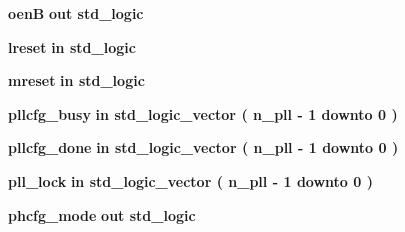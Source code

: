 \begin{DoxyCompactItemize}
\item 
{\bf oenB}  {\bfseries {\bfseries \textcolor{keywordflow}{out}\textcolor{vhdlchar}{ }}} {\bfseries \textcolor{comment}{std\+\_\+logic}\textcolor{vhdlchar}{ }} 
\item 
{\bf lreset}  {\bfseries {\bfseries \textcolor{keywordflow}{in}\textcolor{vhdlchar}{ }}} {\bfseries \textcolor{comment}{std\+\_\+logic}\textcolor{vhdlchar}{ }} 
\item 
{\bf mreset}  {\bfseries {\bfseries \textcolor{keywordflow}{in}\textcolor{vhdlchar}{ }}} {\bfseries \textcolor{comment}{std\+\_\+logic}\textcolor{vhdlchar}{ }} 
\item 
{\bf pllcfg\+\_\+busy}  {\bfseries {\bfseries \textcolor{keywordflow}{in}\textcolor{vhdlchar}{ }}} {\bfseries \textcolor{comment}{std\+\_\+logic\+\_\+vector}\textcolor{vhdlchar}{ }\textcolor{vhdlchar}{(}\textcolor{vhdlchar}{ }\textcolor{vhdlchar}{ }\textcolor{vhdlchar}{ }\textcolor{vhdlchar}{ }{\bfseries {\bf n\+\_\+pll}} \textcolor{vhdlchar}{-\/}\textcolor{vhdlchar}{ } \textcolor{vhdldigit}{1} \textcolor{vhdlchar}{ }\textcolor{keywordflow}{downto}\textcolor{vhdlchar}{ }\textcolor{vhdlchar}{ } \textcolor{vhdldigit}{0} \textcolor{vhdlchar}{ }\textcolor{vhdlchar}{)}\textcolor{vhdlchar}{ }} 
\item 
{\bf pllcfg\+\_\+done}  {\bfseries {\bfseries \textcolor{keywordflow}{in}\textcolor{vhdlchar}{ }}} {\bfseries \textcolor{comment}{std\+\_\+logic\+\_\+vector}\textcolor{vhdlchar}{ }\textcolor{vhdlchar}{(}\textcolor{vhdlchar}{ }\textcolor{vhdlchar}{ }\textcolor{vhdlchar}{ }\textcolor{vhdlchar}{ }{\bfseries {\bf n\+\_\+pll}} \textcolor{vhdlchar}{-\/}\textcolor{vhdlchar}{ } \textcolor{vhdldigit}{1} \textcolor{vhdlchar}{ }\textcolor{keywordflow}{downto}\textcolor{vhdlchar}{ }\textcolor{vhdlchar}{ } \textcolor{vhdldigit}{0} \textcolor{vhdlchar}{ }\textcolor{vhdlchar}{)}\textcolor{vhdlchar}{ }} 
\item 
{\bf pll\+\_\+lock}  {\bfseries {\bfseries \textcolor{keywordflow}{in}\textcolor{vhdlchar}{ }}} {\bfseries \textcolor{comment}{std\+\_\+logic\+\_\+vector}\textcolor{vhdlchar}{ }\textcolor{vhdlchar}{(}\textcolor{vhdlchar}{ }\textcolor{vhdlchar}{ }\textcolor{vhdlchar}{ }\textcolor{vhdlchar}{ }{\bfseries {\bf n\+\_\+pll}} \textcolor{vhdlchar}{-\/}\textcolor{vhdlchar}{ } \textcolor{vhdldigit}{1} \textcolor{vhdlchar}{ }\textcolor{keywordflow}{downto}\textcolor{vhdlchar}{ }\textcolor{vhdlchar}{ } \textcolor{vhdldigit}{0} \textcolor{vhdlchar}{ }\textcolor{vhdlchar}{)}\textcolor{vhdlchar}{ }} 
\item 
{\bf phcfg\+\_\+mode}  {\bfseries {\bfseries \textcolor{keywordflow}{out}\textcolor{vhdlchar}{ }}} {\bfseries \textcolor{comment}{std\+\_\+logic}\textcolor{vhdlchar}{ }} 

\end{DoxyCompactItemize}
